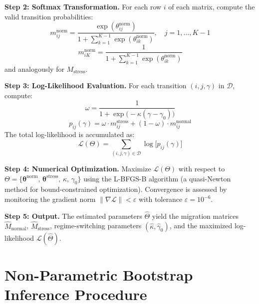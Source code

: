 \documentclass[12pt,a4paper]{article}
\newcommand{\Mstress}{M_{\text{stress}}}
\begin{document}
\textbf{Step 2: Softmax Transformation.} For each row $i$ of each matrix, compute the valid transition probabilities:
\begin{equation}
m_{ij}^{\text{norm}} = \frac{\exp(\theta_{ij}^{\text{norm}})}{1 + \sum_{k=1}^{K-1} \exp(\theta_{ik}^{\text{norm}})}, \quad j = 1, \ldots, K-1
\end{equation}
\begin{equation}
m_{iK}^{\text{norm}} = \frac{1}{1 + \sum_{k=1}^{K-1} \exp(\theta_{ik}^{\text{norm}})}
\end{equation}
and analogously for $\Mstress$.

\textbf{Step 3: Log-Likelihood Evaluation.} For each transition $(i, j, \gamma)$ in $\mathcal{D}$, compute:
\begin{equation}
\omega = \frac{1}{1 + \exp\bigl(-\kappa(\gamma - \gamma_0)\bigr)}
\end{equation}
\begin{equation}
p_{ij}(\gamma) = \omega \cdot m_{ij}^{\text{stress}} + (1 - \omega) \cdot m_{ij}^{\text{normal}}
\end{equation}
The total log-likelihood is accumulated as:
\begin{equation}
\mathcal{L}(\Theta) = \sum_{(i,j,\gamma) \in \mathcal{D}} \log\bigl[p_{ij}(\gamma)\bigr]
\end{equation}

\textbf{Step 4: Numerical Optimization.} Maximize $\mathcal{L}(\Theta)$ with respect to $\Theta = \{\boldsymbol{\theta}^{\text{norm}},\, \boldsymbol{\theta}^{\text{stress}},\, \kappa,\, \gamma_0\}$ using the L-BFGS-B algorithm (a quasi-Newton method for bound-constrained optimization). Convergence is assessed by monitoring the gradient norm $\|\nabla \mathcal{L}\| < \varepsilon$ with tolerance $\varepsilon = 10^{-6}$.

\textbf{Step 5: Output.} The estimated parameters $\hat{\Theta}$ yield the migration matrices $\hat{M}_{\text{normal}}$, $\hat{M}_{\text{stress}}$, regime-switching parameters $(\hat{\kappa}, \hat{\gamma}_0)$, and the maximized log-likelihood $\mathcal{L}(\hat{\Theta})$.

\section{Non-Parametric Bootstrap Inference Procedure}
\label{app:bootstrap}
\end{document}
